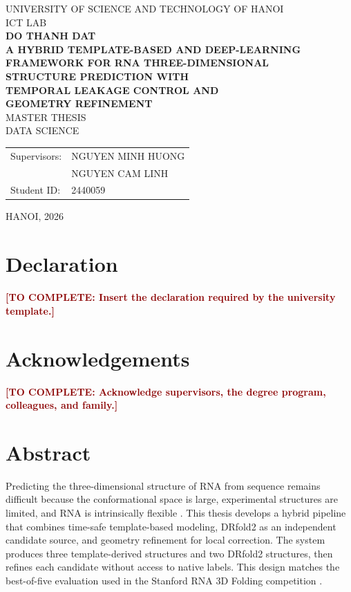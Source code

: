 \documentclass[12pt,a4paper,oneside]{report}
\newcommand{\todo}[1]{\textcolor{darkred}{\textbf{[TO COMPLETE: #1]}}}
\begin{document}
\begin{titlepage}
\begin{center}
  {\large UNIVERSITY OF SCIENCE AND TECHNOLOGY OF HANOI}\\[0.25cm]
  {\large ICT LAB}\\[1.6cm]
  {\Large\bfseries DO THANH DAT}\\[1.5cm]
  {\Large\bfseries
  A HYBRID TEMPLATE-BASED AND DEEP-LEARNING\\
  FRAMEWORK FOR RNA THREE-DIMENSIONAL\\
  STRUCTURE PREDICTION WITH\\
  TEMPORAL LEAKAGE CONTROL AND\\
  GEOMETRY REFINEMENT
  }\\[1.5cm]
  {\large MASTER THESIS}\\[0.5cm]
  {\large DATA SCIENCE}\\[1.6cm]
  \begin{tabularx}{0.94\textwidth}{lX}
  Supervisors: & NGUYEN MINH HUONG\\
  & NGUYEN CAM LINH\\
  Student ID: & 2440059
  \end{tabularx}
  \vfill
  {\large HANOI, 2026}
\end{center}
\end{titlepage}


\chapter*{Declaration}
\todo{Insert the declaration required by the university template.}

\chapter*{Acknowledgements}
\todo{Acknowledge supervisors, the degree program, colleagues, and family.}

\chapter*{Abstract}

Predicting the three-dimensional structure of RNA from sequence remains difficult
because the conformational space is large, experimental structures are limited, and RNA
is intrinsically flexible \cite{zhang_experimental_review,rna_progress_review,
state_of_rnart}. This thesis develops a hybrid pipeline that combines time-safe
template-based modeling, DRfold2 as an independent candidate source, and geometry
refinement for local correction. The system produces three template-derived structures
and two DRfold2 structures, then refines each candidate without access to native labels.
This design matches the best-of-five evaluation used in the Stanford RNA 3D Folding
competition \cite{competition_paper,kaggle_competition}.
\end{document}
